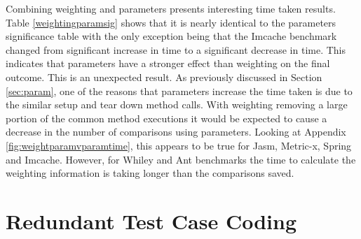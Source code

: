 Combining weighting and parameters presents interesting time taken results. Table \ref{weightingparamsig} shows that it is nearly identical to the parameters significance table with the only exception being that the Imcache benchmark changed from significant increase in time to a significant decrease in time. This indicates that parameters have a stronger effect than weighting on the final outcome. This is an unexpected result. As previously discussed in Section \ref{sec:param}, one of the reasons that parameters increase the time taken is due to the similar setup and tear down method calls. With weighting removing a large portion of the common method executions it would be expected to cause a decrease in the number of comparisons using parameters. Looking at Appendix \ref{fig:weightparamvparamtime}, this appears to be true for Jasm, Metric-x, Spring and Imcache. However, for Whiley and Ant benchmarks the time to calculate the weighting information is taking longer than the comparisons saved. 

\section{Redundant Test Case Coding}

